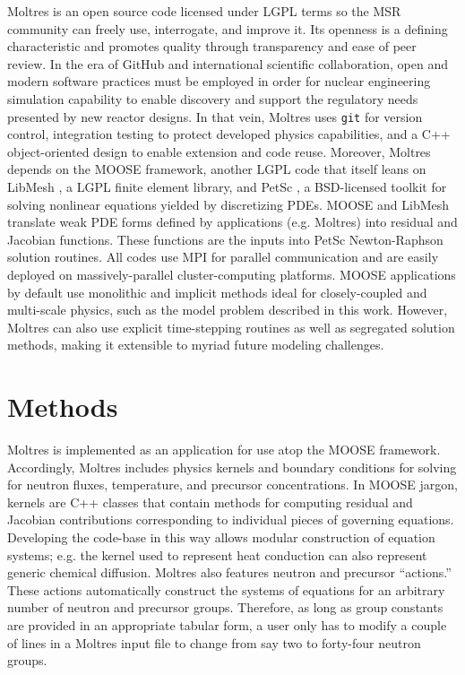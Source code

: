\documentclass{article}
\let\Oldsection\section
\renewcommand{\section}{\FloatBarrier\Oldsection}
\begin{document}
Moltres is an open source code licensed under \gls{LGPL} terms so the 
\gls{MSR} community can freely use, interrogate, and improve it.  Its openness 
is a defining characteristic and promotes
quality through transparency and ease of peer review. In the era of
GitHub\cite{github_build_2017} and international scientific collaboration,
open and modern software practices must be employed in order for nuclear
engineering simulation capability to enable discovery and support the regulatory
needs presented by new reactor designs. In that vein, Moltres uses
\texttt{git} for version control, integration testing to protect
developed physics capabilities, and a C++ object-oriented design to
enable extension and code reuse. Moreover, Moltres depends on the \gls{MOOSE} 
framework, \cite{gaston_physics-based_2015} another \gls{LGPL} code that itself 
leans on LibMesh \cite{kirk_libmesh:_2006}, a
\gls{LGPL} finite element library, and PetSc \cite{satish_balay_petsc_2015}, a
\gls{BSD}-licensed toolkit for solving nonlinear equations yielded by 
discretizing PDEs. \gls{MOOSE} and LibMesh translate weak PDE forms defined by
applications (e.g. Moltres) into residual and Jacobian
functions. These functions are the inputs into PetSc Newton-Raphson solution routines. All
codes use MPI for parallel communication and are easily deployed on
massively-parallel cluster-computing platforms. \gls{MOOSE} applications by
default use monolithic and implicit methods ideal for closely-coupled
and multi-scale physics, such as the model problem described
in this work. However, Moltres can also use explicit
time-stepping routines as well as segregated solution methods, making it 
extensible to myriad future modeling challenges.

\section{Methods}

Moltres \cite{lindsay_moltres_2017} is implemented as an application for
use atop the \gls{MOOSE} \cite{gaston_physics-based_2015} framework.
Accordingly, Moltres includes physics kernels and boundary conditions for
solving for neutron fluxes, temperature, and precursor concentrations. In \gls{MOOSE}
jargon, kernels are C++ classes that contain methods for computing residual and
Jacobian contributions corresponding to individual pieces of governing
equations. Developing the code-base in this way allows modular construction
of equation systems; e.g. the kernel used to represent heat
conduction can also represent generic chemical diffusion. Moltres
also features neutron and precursor ``actions.'' These actions automatically 
construct the systems of equations for an arbitrary number of neutron and
precursor groups. Therefore, as long as group constants are provided in an appropriate
tabular form, a user only has to modify a couple of lines in a Moltres input
file to change from say two to forty-four neutron groups.
\end{document}
